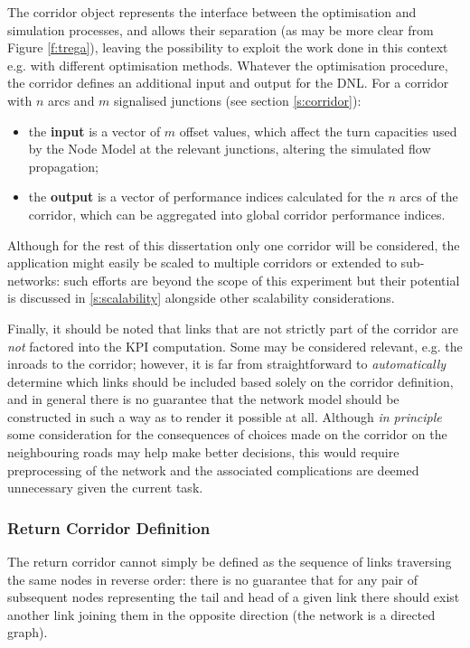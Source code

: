 The corridor object represents the interface between the optimisation and simulation processes, and allows their separation (as may be more clear from Figure \ref{f:trega}), leaving the possibility to exploit the work done in this context e.g. with different optimisation methods. Whatever the optimisation procedure, the corridor defines an additional input and output for the DNL. For a corridor with $n$ arcs and $m$ signalised junctions (see section \ref{s:corridor}):
\begin{itemize}
\item the \textbf{input} is a vector of $m$ offset values, which affect the turn capacities used by the Node Model at the relevant junctions, altering the simulated flow propagation;
\item the \textbf{output} is a vector of performance indices calculated for the $n$ arcs of the corridor, which can be aggregated into global corridor performance indices.
\end{itemize}

Although for the rest of this dissertation only one corridor will be considered, the application might easily be scaled to multiple corridors or extended to sub-networks: such efforts are beyond the scope of this experiment but their potential is discussed in \ref{s:scalability} alongside other scalability considerations.

Finally, it should be noted that links that are not strictly part of the corridor are \emph{not} factored into the KPI computation. Some may be considered relevant, e.g. the inroads to the corridor; however, it is far from straightforward to \emph{automatically} determine which links should be included based solely on the corridor definition, and in general there is no guarantee that the network model should be constructed in such a way as to render it possible at all. Although \emph{in principle} some consideration for the consequences of choices made on the corridor on the neighbouring roads may help make better decisions, this would require preprocessing of the network and the associated complications are deemed unnecessary given the current task.

\subsubsection*{Return Corridor Definition}
The return corridor cannot simply be defined as the sequence of links traversing the same nodes in reverse order: there is no guarantee that for any pair of subsequent nodes representing the tail and head of a given link there should exist another link joining them in the opposite direction (the network is a directed graph).

